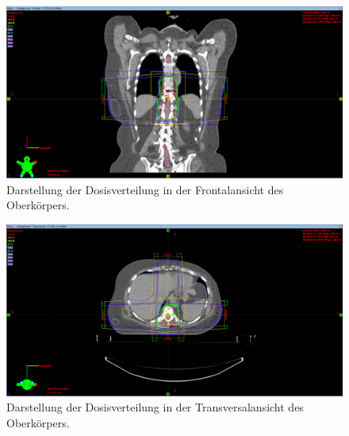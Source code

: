 \begin{figure}[H]
	\centering
	\includegraphics[width=\linewidth]{Bilder/BWS_Y}
	\caption{Darstellung der Dosisverteilung in der Frontalansicht des Oberkörpers.}
	\label{fig:bwsy}
\end{figure}

\begin{figure}[H]
	\centering
	\includegraphics[width=\linewidth]{Bilder/BWS_Z}
	\caption{Darstellung der Dosisverteilung in der Transversalansicht des Oberkörpers.}
	\label{fig:bwsz}
\end{figure}

